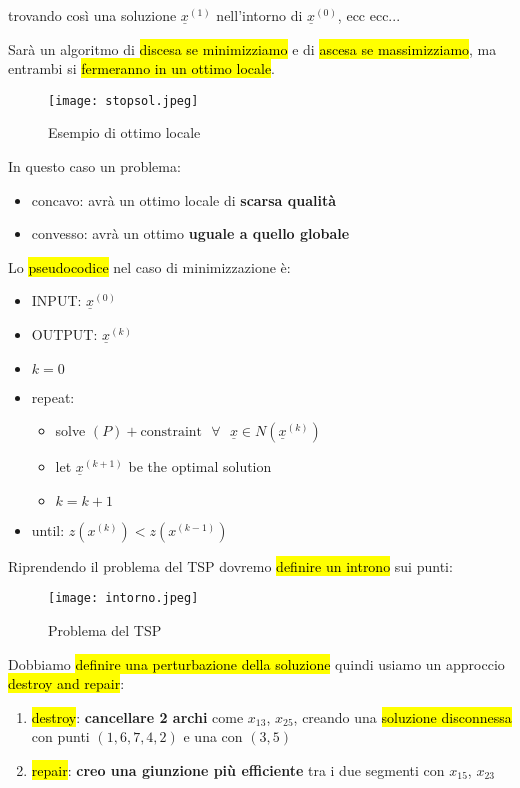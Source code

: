 trovando così una soluzione $\underline{x}^{(1)}$ nell'intorno di $\underline{x}^{(0)}$, ecc ecc...

Sarà un algoritmo di \hl{discesa se minimizziamo} e di \hl{ascesa se massimizziamo}, ma entrambi si \hl{fermeranno in un ottimo locale}.


\begin{figure}[H]
\centering
\texttt{[image: stopsol.jpeg]}
\caption{Esempio di ottimo locale} 
\label{stopsol}
\end{figure}


In questo caso un problema:

\begin{itemize}
    \item concavo: avrà un ottimo locale di \textbf{scarsa qualità}
    \item convesso: avrà un ottimo \textbf{uguale a quello globale}
\end{itemize}

Lo \hl{pseudocodice} nel caso di minimizzazione è:

\begin{itemize}
    \item[] INPUT: $\underline{x}^{(0)}$
    \item[] OUTPUT: $\underline{x}^{(k)}$
    \item[] $k = 0$
    \item[] repeat:
    \begin{itemize}
        \item[] solve $(P) + \text{constraint}\ \ \ \forall\ \ \ \underline{x}\in N(\underline{x}^{(k)})$
        \item[] let $\underline{x}^{(k+1)}$ be the optimal solution
        \item[] $k=k+1$
    \end{itemize}
    \item[] until: $z(x^{(k)})<z(x^{(k-1)})$
\end{itemize}

Riprendendo il problema del TSP dovremo \hl{definire un introno} sui punti:


\begin{figure}[H]
\centering
\texttt{[image: intorno.jpeg]}
\caption{Problema del TSP} 
\label{intorno}
\end{figure}


Dobbiamo \hl{definire una perturbazione della soluzione} quindi usiamo un approccio \hl{destroy and repair}:

\begin{enumerate}
    \item \hl{destroy}: \textbf{cancellare 2 archi} come $x_{13}$, $x_{25}$, creando una \hl{soluzione disconnessa} con punti $(1, 6, 7, 4, 2)$ e una con $(3, 5)$
    \item \hl{repair}: \textbf{creo una giunzione più efficiente} tra i due segmenti con $x_{15}$, $x_{23}$
\end{enumerate}

